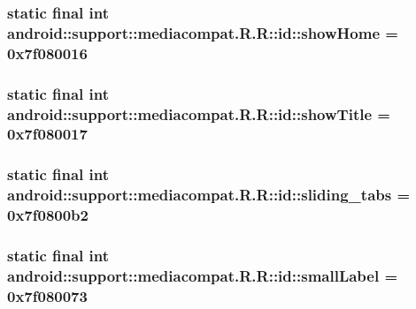 \hypertarget{classandroid_1_1support_1_1mediacompat_1_1_r_1_1id_defcddd0cad4a9de1bc8a44342b3b75b}{
\subsubsection[{showHome}]{\setlength{\rightskip}{0pt plus 5cm}static final int android::support::mediacompat.R.R::id::showHome = 0x7f080016}}
\label{classandroid_1_1support_1_1mediacompat_1_1_r_1_1id_defcddd0cad4a9de1bc8a44342b3b75b}


\hypertarget{classandroid_1_1support_1_1mediacompat_1_1_r_1_1id_28b999e96c65db8ff4adc354a31918a7}{
\subsubsection[{showTitle}]{\setlength{\rightskip}{0pt plus 5cm}static final int android::support::mediacompat.R.R::id::showTitle = 0x7f080017}}
\label{classandroid_1_1support_1_1mediacompat_1_1_r_1_1id_28b999e96c65db8ff4adc354a31918a7}


\hypertarget{classandroid_1_1support_1_1mediacompat_1_1_r_1_1id_bca76c126f4805450987148646e5e31e}{
\subsubsection[{sliding\_\-tabs}]{\setlength{\rightskip}{0pt plus 5cm}static final int android::support::mediacompat.R.R::id::sliding\_\-tabs = 0x7f0800b2}}
\label{classandroid_1_1support_1_1mediacompat_1_1_r_1_1id_bca76c126f4805450987148646e5e31e}


\hypertarget{classandroid_1_1support_1_1mediacompat_1_1_r_1_1id_1d519350824b982c87575ee04c9b0e99}{
\subsubsection[{smallLabel}]{\setlength{\rightskip}{0pt plus 5cm}static final int android::support::mediacompat.R.R::id::smallLabel = 0x7f080073}}
\label{classandroid_1_1support_1_1mediacompat_1_1_r_1_1id_1d519350824b982c87575ee04c9b0e99}


